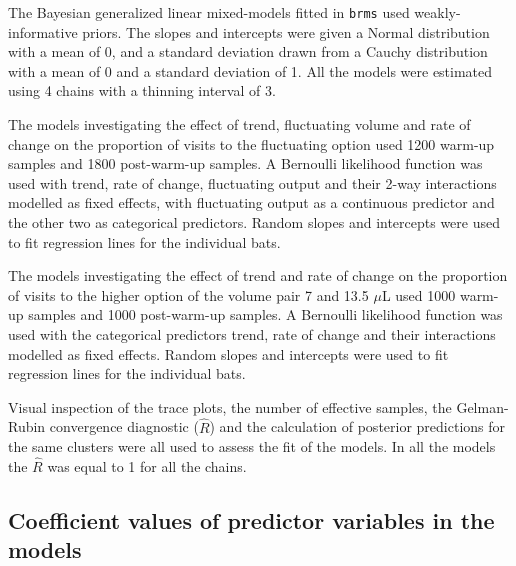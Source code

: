\documentclass[
]{article}
\begin{document}
The Bayesian generalized linear mixed-models fitted in \texttt{brms} used weakly-informative priors. The slopes and intercepts were given a Normal distribution with a mean of 0, and a standard deviation drawn from a Cauchy distribution with a mean of 0 and a standard deviation of 1. All the models were estimated using 4 chains with a thinning interval of 3.

The models investigating the effect of trend, fluctuating volume and rate of change on the proportion of visits to the fluctuating option used 1200 warm-up samples and 1800 post-warm-up samples. A Bernoulli likelihood function was used with trend, rate of change, fluctuating output and their 2-way interactions modelled as fixed effects, with fluctuating output as a continuous predictor and the other two as categorical predictors. Random slopes and intercepts were used to fit regression lines for the individual bats.

The models investigating the effect of trend and rate of change on the proportion of visits to the higher option of the volume pair 7 and 13.5 \(\mu\)L used 1000 warm-up samples and 1000 post-warm-up samples. A Bernoulli likelihood function was used with the categorical predictors trend, rate of change and their interactions modelled as fixed effects. Random slopes and intercepts were used to fit regression lines for the individual bats.

Visual inspection of the trace plots, the number of effective samples, the Gelman-Rubin convergence diagnostic (\(\hat R\)) and the calculation of posterior predictions for the same clusters were all used to assess the fit of the models. In all the models the \(\hat R\) was equal to 1 for all the chains.

\hypertarget{coefficient-values-of-predictor-variables-in-the-models}{%
\subsection{Coefficient values of predictor variables in the models}\label{coefficient-values-of-predictor-variables-in-the-models}}
\end{document}

